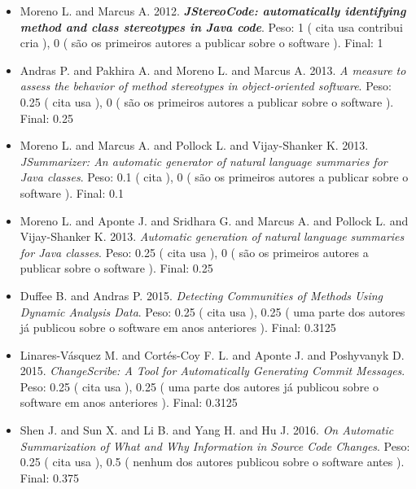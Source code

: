 \begin{itemize}
\item Moreno L. and Marcus A.
      2012.
        \textbf{\textit{ JStereoCode: automatically identifying method and class stereotypes in Java code}}.
      Peso:
      1 (
          cita
          usa
          contribui
          cria
      ),
      0 (
são os primeiros autores a publicar sobre o software
      ).
      Final:
      1

\item Andras P. and Pakhira A. and Moreno L. and Marcus A.
      2013.
        \textit{ A measure to assess the behavior of method stereotypes in object-oriented software}.
      Peso:
      0.25 (
          cita
          usa
      ),
      0 (
são os primeiros autores a publicar sobre o software
      ).
      Final:
      0.25

\item Moreno L. and Marcus A. and Pollock L. and Vijay-Shanker K.
      2013.
        \textit{ JSummarizer: An automatic generator of natural language summaries for Java classes}.
      Peso:
      0.1 (
          cita
      ),
      0 (
são os primeiros autores a publicar sobre o software
      ).
      Final:
      0.1

\item Moreno L. and Aponte J. and Sridhara G. and Marcus A. and Pollock L. and Vijay-Shanker K.
      2013.
        \textit{ Automatic generation of natural language summaries for Java classes}.
      Peso:
      0.25 (
          cita
          usa
      ),
      0 (
são os primeiros autores a publicar sobre o software
      ).
      Final:
      0.25

\item Duffee B. and Andras P.
      2015.
        \textit{ Detecting Communities of Methods Using Dynamic Analysis Data}.
      Peso:
      0.25 (
          cita
          usa
      ),
      0.25 (
uma parte dos autores já publicou sobre o software em anos anteriores
      ).
      Final:
      0.3125

\item Linares-V\'{a}squez M. and Cort{\'e}s-Coy F. L. and Aponte J. and Poshyvanyk D.
      2015.
        \textit{ ChangeScribe: A Tool for Automatically Generating Commit Messages}.
      Peso:
      0.25 (
          cita
          usa
      ),
      0.25 (
uma parte dos autores já publicou sobre o software em anos anteriores
      ).
      Final:
      0.3125

\item Shen J. and Sun X. and Li B. and Yang H. and Hu J.
      2016.
        \textit{ On Automatic Summarization of What and Why Information in Source Code Changes}.
      Peso:
      0.25 (
          cita
          usa
      ),
      0.5 (
nenhum dos autores publicou sobre o software antes
      ).
      Final:
      0.375


\end{itemize}
